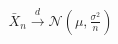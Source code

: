\documentclass[preview]{standalone}
\begin{document}
\begin{align*}
\bar{X}_n \xrightarrow{d} \mathcal{N}(\mu, \frac{\sigma^2}{n})
\end{align*}
\end{document}
